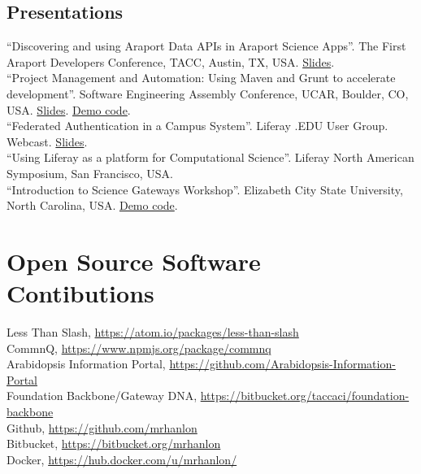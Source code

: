 \documentclass[10pt, a4paper]{article}
\newcommand{\years}[1]{\marginnote{\scriptsize #1}}
\begin{document}
\subsection*{Presentations}
\noindent
\years{2014}``Discovering and using Araport Data APIs in Araport Science Apps''. The First Araport Developers Conference, TACC, Austin, TX, USA. \href{https://github.com/Arabidopsis-Information-Portal/workshop-tutorial-app/blob/tutorial/3/TUTORIAL.md}{Slides}.\\
\years{2014}``Project Management and Automation: Using Maven and Grunt to accelerate development''. Software Engineering Assembly Conference, UCAR, Boulder, CO, USA. \href{https://mrhanlon.com/slides/sea2014}{Slides}. \href{https://github.com/mrhanlon/sea2014-demo}{Demo code}.\\
\years{2014}``Federated Authentication in a Campus System''. Liferay .EDU User Group. Webcast. \href{http://www.slideshare.net/mrhanlon/federated-authe}{Slides}.\\
\years{2013}``Using Liferay as a platform for Computational
Science''. Liferay North American Symposium, San Francisco, USA.\\
\years{2013}``Introduction to Science Gateways Workshop''. Elizabeth City State University, North Carolina, USA. \href{https://bitbucket.org/taccaci/gateway-dna-tutorial}{Demo code}.

%


\section*{Open Source Software Contibutions}
Less Than Slash, \href{https://atom.io/packages/less-than-slash}{https://atom.io/packages/less-than-slash}\\
CommnQ, \href{https://www.npmjs.org/package/commnq}{https://www.npmjs.org/package/commnq}\\
Arabidopsis Information Portal, \href{https://github.com/Arabidopsis-Information-Portal}{https://github.com/Arabidopsis-Information-Portal}\\
Foundation Backbone/Gateway DNA, \href{https://bitbucket.org/taccaci/foundation-backbone}{https://bitbucket.org/taccaci/foundation-backbone}\\

Github, \href{https://github.com/mrhanlon}{https://github.com/mrhanlon}\\
Bitbucket, \href{https://bitbucket.org/mrhanlon}{https://bitbucket.org/mrhanlon}\\
Docker, \href{https://hub.docker.com/u/mrhanlon/}{https://hub.docker.com/u/mrhanlon/}\\
\end{document}
